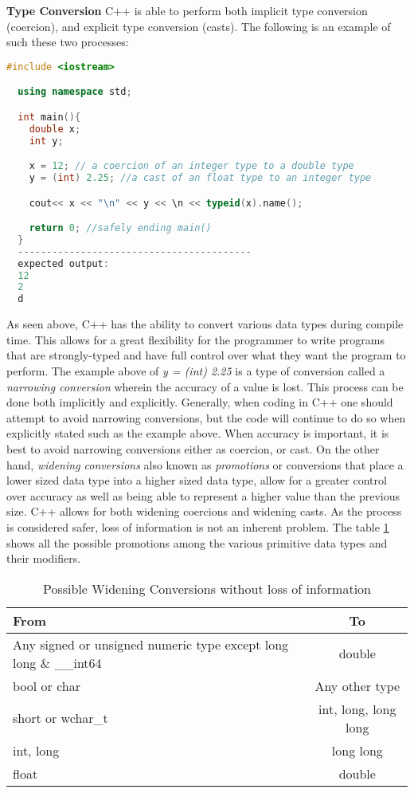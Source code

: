 \documentclass[12pt]{article}
\begin{document}
\textbf{Type Conversion} C++ is able to perform both implicit type conversion (coercion), and explicit type conversion (casts). The following is an example of such these two processes:
\begin{lstlisting}[language=C++]
  #include <iostream>

  using namespace std;

  int main(){
    double x;
    int y;

    x = 12; // a coercion of an integer type to a double type
    y = (int) 2.25; //a cast of an float type to an integer type

    cout<< x << "\n" << y << \n << typeid(x).name();

    return 0; //safely ending main()
  }
  -----------------------------------------
  expected output:
  12
  2
  d
\end{lstlisting}

As seen above, C++ has the ability to convert various data types during compile time. This allows for a great flexibility for the programmer to write programs that are strongly-typed and have full control over what they want the program to perform. The example above of \textit{y = (int) 2.25} is a type of conversion called a \textit{narrowing conversion} wherein the accuracy of a value is lost. This process can be done both implicitly and explicitly. Generally, when coding in C++ one should attempt to avoid narrowing conversions, but the code will continue to do so when explicitly stated such as the example above. When accuracy is important, it is best to avoid narrowing conversions either as coercion, or cast. On the other hand, \textit{widening conversions} also known as \textit{promotions} or conversions that place a lower sized data type into a higher sized data type, allow for a greater control over accuracy as well as being able to represent a higher value than the previous size. C++ allows for both widening coercions and widening casts. As the process is considered safer, loss of information is not an inherent problem. The table \ref{table:DTP} shows all the possible promotions among the various primitive data types and their modifiers.

\begin{table}[h!]
  \begin{center}
    \caption{Possible Widening Conversions without loss of information}
    \label{table:DTP}
    \begin{tabular}{|l|c|}
      \toprule %
      \textbf{From} & \textbf{To} \\
      \midrule %
      Any signed or unsigned numeric type except long long \& \_\_int64 & double \\
      \hline
      bool or char & Any other type \\
      \hline
      short or wchar\_t & int, long, long long \\
      \hline
      int, long & long long \\
      \hline
      float & double \\
      \bottomrule
    \end{tabular}
  \end{center}
\end{table}
\end{document}
